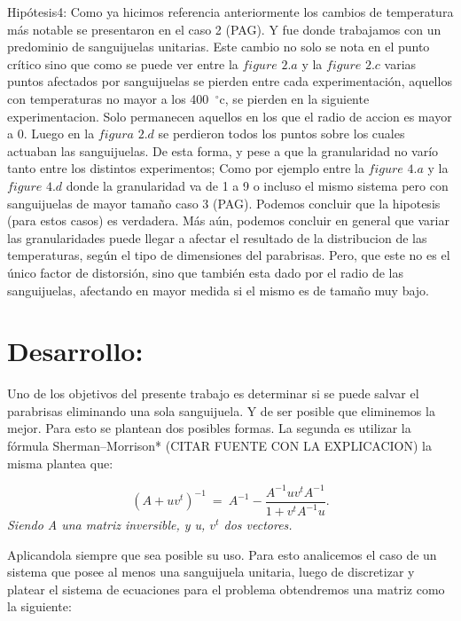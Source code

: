 \documentclass[a4paper]{article}
\begin{document}
Hipótesis4: Como ya hicimos referencia anteriormente los cambios de temperatura más notable se presentaron en el caso 2 (PAG). Y fue donde trabajamos con un predominio de sanguijuelas unitarias. Este cambio no solo se nota en el punto crítico sino que como se puede ver entre la $figure$ $2.a$ y la $figure$ $2.c$ varias puntos afectados por sanguijuelas se pierden entre cada experimentación, aquellos con temperaturas no mayor a los 400\hspace{-1.5mm}$\phantom{a}^{\circ}$c, se pierden en la siguiente experimentacion. Solo permanecen aquellos en los que el radio de accion es mayor a 0. Luego en la $figura$ $2.d$ se perdieron todos los puntos sobre los cuales actuaban las sanguijuelas. De esta forma, y pese a que la granularidad no varío tanto entre los distintos experimentos; Como por ejemplo entre la $figure$ $4.a$ y la $figure$ $4.d$ donde la granularidad va de 1 a 9 o  incluso el mismo sistema pero  con sanguijuelas de mayor tamaño caso 3 (PAG). Podemos concluir que la hipotesis (para estos casos) es verdadera. Más aún, podemos concluir en general que variar las granularidades puede llegar a afectar el resultado de la distribucion de las temperaturas, según el tipo de dimensiones del parabrisas. Pero, que este no es el único factor de distorsión, sino que también esta dado por el radio de las sanguijuelas, afectando en mayor medida si el mismo es de tamaño muy bajo.  




\section{Desarrollo:}


Uno de los objetivos del presente trabajo es determinar si se puede salvar el parabrisas eliminando una sola sanguijuela. Y de ser posible que eliminemos la mejor. Para esto se plantean dos posibles formas. La segunda es utilizar la fórmula Sherman–Morrison* (CITAR FUENTE CON LA EXPLICACION) la misma plantea que:

\begin{equation}
	(A+ uv^t)^{-1} \ =\ A^{-1} - \frac{ A^{-1} u v^t A^{-1} }{1+v^t A^{-1}u}.\label{eq:sm}
\end{equation} 
\textit{Siendo A una matriz inversible, y u, $v^t$ dos vectores.}


Aplicandola siempre que sea posible su uso. Para esto analicemos el caso de un sistema que posee al menos una sanguijuela unitaria, luego de discretizar y platear el sistema de ecuaciones para el problema obtendremos una matriz como la siguiente:
\end{document}
